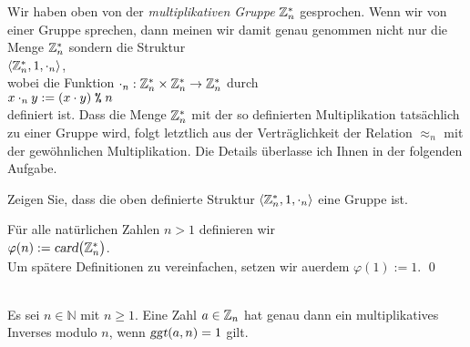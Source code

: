 \remark
Wir haben oben von der \emph{multiplikativen Gruppe} $\mathbb{Z}_{n}^*$ gesprochen.  Wenn wir von
einer Gruppe sprechen, dann meinen wir damit genau genommen nicht nur die Menge $\mathbb{Z}_{n}^*$
sondern die Struktur 
\\[0.2cm]
\hspace*{1.3cm}
$\langle \mathbb{Z}_{n}^*, 1, \cdot_n \rangle$,
\\[0.2cm]
wobei die Funktion $\cdot_n : \mathbb{Z}_{n}^* \times \mathbb{Z}_{n}^* \rightarrow \mathbb{Z}_{n}^*$ durch 
\\[0.2cm]
\hspace*{1.3cm}
$x \cdot_n y := (x \cdot y) \;\texttt{\%}\; n$
\\[0.2cm]
definiert ist.  Dass die Menge $\mathbb{Z}_{n}^*$ mit der so definierten Multiplikation tats\"{a}chlich
zu einer Gruppe wird, folgt letztlich aus der Vertr\"{a}glichkeit der Relation $\approx_n$ mit der
gew\"{o}hnlichen Multiplikation.  Die Details \"{u}berlasse ich Ihnen in der folgenden Aufgabe.

\exercise
Zeigen Sie, dass die oben definierte Struktur $\langle \mathbb{Z}_{n}^*, 1, \cdot_n \rangle$
eine Gruppe ist.


\begin{Definition} F\"{u}r alle nat\"{u}rlichen Zahlen $n > 1$ definieren wir
\\[0.2cm]
\hspace*{1.3cm}
$\varphi(n) := \textsl{card}\bigl(\mathbb{Z}_{n}^*\bigr)$.
\\[0.2cm]
Um sp\"{a}tere Definitionen zu vereinfachen,  setzen wir au\3erdem $\varphi(1) := 1$. \qed
\end{Definition}

\begin{Satz} 
  \label{satz:multiplikatives-inverses}
  \hspace*{\fill} \\
  Es sei $n \in \mathbb{N}$ mit $n \geq 1$.
  Eine Zahl $a \in \mathbb{Z}_{n}$ hat genau dann ein multiplikatives Inverses modulo $n$, wenn
  $\textsl{ggt}(a, n) = 1$ gilt.
\end{Satz}


